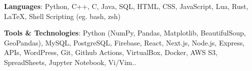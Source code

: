 \begin{cventries}

 
      \begin{cvitems} %
        \item {\textbf{Languages}: Python, C++, C, Java, SQL, HTML, CSS, JavaScript, Lua, Rust, LaTeX, Shell Scripting (eg. bash, zsh)}
        \item {\textbf{Tools \& Technologies}: Python (NumPy, Pandas, Matplotlib, BeautifulSoup, GeoPandas), MySQL, PostgreSQL, Firebase, React, Next.js, Node.js, Express, APIs, WordPress, Git, Github Actions, VirtualBox, Docker, AWS S3, SpreadSheets, Jupyter Notebook, Vi/Vim..}
      \end{cvitems}
    
\end{cventries}
